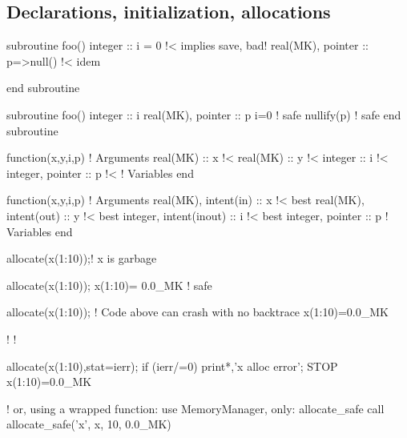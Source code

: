 \documentclass{article}
\begin{document}
\subsection{Declarations, initialization, allocations}
\begin{codea}
subroutine foo()
  integer :: i = 0 !< implies save, bad!
  real(MK), pointer :: p=>null() !< idem
   

end subroutine 
\end{codea} 
\begin{codeb}
subroutine foo()
  integer :: i
  real(MK), pointer :: p
  i=0        ! safe
  nullify(p) ! safe
end subroutine 
\end{codeb}
\begin{codea}
function(x,y,i,p)
  ! Arguments
  real(MK) :: x !<
  real(MK) :: y !<
  integer  :: i !<
  integer, pointer :: p !<
  ! Variables
end
\end{codea} 
\begin{codeb}
function(x,y,i,p)
  ! Arguments
  real(MK), intent(in)   :: x !< best
  real(MK), intent(out)  :: y !< best
  integer, intent(inout) :: i !< best
  integer, pointer :: p
  ! Variables
end
\end{codeb}
\begin{codea}
allocate(x(1:10));! x is garbage
\end{codea} 
\begin{codeb}
allocate(x(1:10)); x(1:10)= 0.0_MK ! safe
\end{codeb}
\begin{codea}
allocate(x(1:10));
! Code above can crash with no backtrace
x(1:10)=0.0_MK


! 
! 
\end{codea} 
\begin{codeb}
allocate(x(1:10),stat=ierr); 
if (ierr/=0) print*,'x alloc error'; STOP
x(1:10)=0.0_MK

! or, using a wrapped function:
use MemoryManager, only: allocate_safe
call allocate_safe('x', x, 10, 0.0_MK)
\end{codeb}
\end{document}

